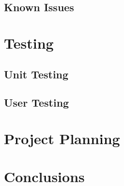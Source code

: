 \documentclass[12pt, a4paper,twoside]{report}
\theoremstyle{plain} %
\theoremstyle{definition} %
\numberwithin{equation}{chapter}
\begin{document}
\section{Known Issues}\label{sec:knownissues}


\chapter{Testing}\label{ch:testing}

\section{Unit Testing}\label{sec:unittesting}

\section{User Testing}\label{sec:usertesting}


\chapter {Project Planning}\label{ch:projectplanning}


\chapter{Conclusions}\label{ch:conclusion}



\end{document}
